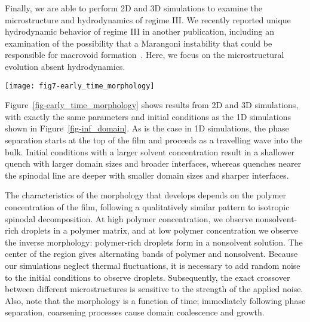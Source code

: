 \documentclass[journal=mamobx, layout=twocolumn]{achemso}
\begin{document}
Finally, we are able to perform 2D and 3D simulations to examine the microstructure and hydrodynamics of regime III.
We recently reported unique hydrodynamic behavior of regime III in another publication, including an examination of the possibility that a Marangoni instability that could be responsible for macrovoid formation~\cite{Tree2018}.
Here, we focus on the microstructural evolution absent hydrodynamics.

\begin{figure*}[tbp]
  \texttt{[image: fig7-early\_time\_morphology]}
  \caption{(a) The part of the composition space exhibiting regime III colored by the observed microstructure in 2D simulations: 
non-solvent droplets in a polymer matrix (blue), alternating bands of polymer and nonsolvent (purple) and polymer droplets in nonsolvent (blue-green).
2D contour plots ($256 R_{0} \times 256 R_{0}$) and 3D density plots ($64 R_{0} \times 64 R_{0} \times 32 R_{0}$) of the polymer concentration showing microstructure: (b) nonsolvent droplets, (c) alternating bands and (d) polymer droplets.
The color bar on the right of (d) indicates polymer concentration and is valid for both 2D and 3D plots.
}
  \label{fig-early_time_morphology}
\end{figure*}

Figure~\ref{fig-early_time_morphology} shows results from 2D and 3D simulations, with exactly the same parameters and initial conditions as the 1D simulations shown in Figure~\ref{fig-inf_domain}.
As is the case in 1D simulations, the phase separation starts at the top of the film and proceeds as a travelling wave into the bulk.
Initial conditions with a larger solvent concentration result in a shallower quench with larger domain sizes and broader interfaces, whereas quenches nearer the spinodal line are deeper with smaller domain sizes and sharper interfaces.

The characteristics of the morphology that develops depends on the polymer concentration of the film, following a qualitatively similar pattern to isotropic spinodal decomposition.
At high polymer concentration, we observe nonsolvent-rich droplets in a polymer matrix, and at low polymer concentration we observe the inverse morphology: polymer-rich droplets form in a nonsolvent solution.
The center of the region gives alternating bands of polymer and nonsolvent.
Because our simulations neglect thermal fluctuations, it is necessary to add random noise to the initial conditions to observe droplets. 
Subsequently, the exact crossover between different microstructures is sensitive to the strength of the applied noise.
Also, note that the morphology is a function of time; immediately following phase separation, coarsening processes cause domain coalescence and growth.
\end{document}
